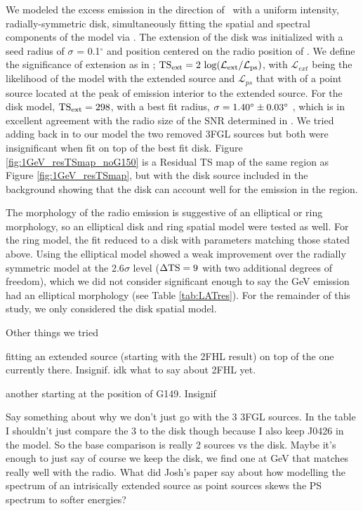 We modeled the excess emission in the direction of \Gone ~with a uniform intensity, radially-symmetric disk, simultaneously fitting the spatial and spectral components of the model  via \ptlike. The extension of the disk was initialized with a seed radius of $\sigma$ = 0.1$^\circ$ and position centered on the radio position of \Gone. We define the significance of extension as in \cite{Lande12}; ${\rm TS_{ext} = 2~log(\mathcal{L}_{ext} / \mathcal{L}_{ps})}$, with $\mathcal{L}_{ext}$ being the likelihood of the model with the extended source and $\mathcal{L}_{ps}$ that with of a point source located at the peak of emission interior to the extended source. For the disk model,  ${\rm TS_{ext} = 298}$, with a best fit radius, ${\rm \sigma = 1.40^\circ \pm 0.03^\circ}$ , which is in excellent agreement with the radio size of the SNR determined in \cite{Gao14}. We tried adding back in to our model the two removed 3FGL sources but both were insignificant when fit on top of the best fit disk. Figure \ref{fig:1GeV_resTSmap_noG150} is a Residual TS map of the same region as Figure \ref{fig:1GeV_resTSmap}, but with the disk source included in the background showing that the disk can account well for the emission in the region. 

The morphology of the radio emission is suggestive of an elliptical or ring morphology, so an elliptical disk and ring spatial model were tested as well. For the ring model, the fit reduced to a disk with parameters matching those stated above. Using the elliptical model showed a weak improvement over the radially symmetric model at the 2.6$\sigma$ level (${\rm \Delta TS = 9}$ with two additional degrees of freedom), which we did not consider significant enough to say the GeV emission had an elliptical morphology (see Table \ref{tab:LATres}). For the remainder of this study, we only considered the disk spatial model.



Other things we tried

fitting an extended source (starting with the 2FHL result) on top of the one currently there. Insignif. idk what to say about 2FHL yet. 

another starting at the position of G149. Insignif


Say something about why we don't just go with the 3 3FGL sources. In the table I shouldn't just compare the 3 to the disk though because I also keep J0426 in the model. So the base comparison is really 2 sources vs the disk. Maybe it's enough to just say of course we keep the disk, we find one at GeV that matches really well with the radio. What did Josh's paper say about how modelling the spectrum of an intrisically extended source as point sources skews the PS spectrum to softer energies?


